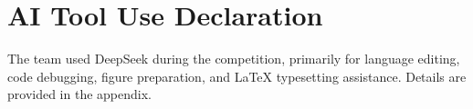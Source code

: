 \documentclass[fontset=windows, scheme=plain, 12pt, a4paper]{ctexart}
\newcommand{\referencescn}{%
}
\begin{document}
	\newpage
	
	
	
	
	
	
	
	
	
	
    \section*{AI Tool Use Declaration}
    The team used DeepSeek during the competition,
    primarily for language editing, code debugging, figure preparation, and LaTeX typesetting assistance.
    Details are provided in the appendix.
	
	
	\referencescn
	
	\newpage
	
\end{document}
